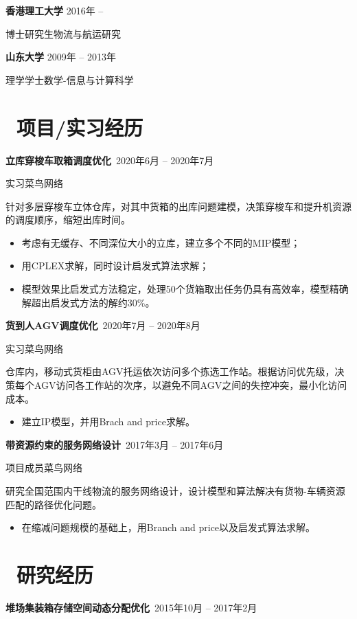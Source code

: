 \documentclass[11pt]{article}
\begin{document}
\textbf{香港理工大学} \hfill 2016年 -- 

博士研究生\quad 物流与航运研究

\textbf{山东大学} \hfill 2009年 -- 2013年

理学学士\quad 数学-信息与计算科学

\section{\makebox[\widthof{\faGraduationCap}][c]{\color{CVBlue}\faUsers}\ 项目/实习经历}

\textbf{立库穿梭车取箱调度优化}\  \hfill 2020年6月 -- 2020年7月

实习\quad 菜鸟网络

针对多层穿梭车立体仓库，对其中货箱的出库问题建模，决策穿梭车和提升机资源的调度顺序，缩短出库时间。

\begin{itemize}
  \item 考虑有无缓存、不同深位大小的立库，建立多个不同的MIP模型；
  \item 用CPLEX求解，同时设计启发式算法求解；
  \item 模型效果比启发式方法稳定，处理50个货箱取出任务仍具有高效率，模型精确解超出启发式方法的解约30\%。
\end{itemize}

\textbf{货到人AGV调度优化}\  \hfill 2020年7月 -- 2020年8月

实习\quad 菜鸟网络

仓库内，移动式货柜由AGV托运依次访问多个拣选工作站。根据访问优先级，决策每个AGV访问各工作站的次序，以避免不同AGV之间的失控冲突，最小化访问成本。

\begin{itemize}
  \item 建立IP模型，并用Brach and price求解。
\end{itemize}

\textbf{带资源约束的服务网络设计}\  \hfill 2017年3月 -- 2017年6月

项目成员\quad 菜鸟网络

研究全国范围内干线物流的服务网络设计，设计模型和算法解决有货物-车辆资源匹配的路径优化问题。

\begin{itemize}
  \item 在缩减问题规模的基础上，用Branch and price以及启发式算法求解。
\end{itemize}


\section{\makebox[\widthof{\faGraduationCap}][c]{\color{CVBlue}\faLightbulbO}\ 研究经历}
\textbf{堆场集装箱存储空间动态分配优化}\  \hfill 2015年10月 -- 2017年2月
\end{document}
